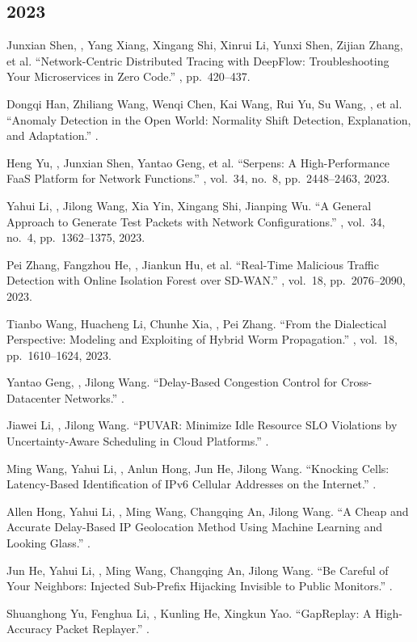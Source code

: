 \documentclass[11pt]{article}
\begin{document}
\subsection*{2023}
\begin{publist}
\item Junxian Shen, \corr, Yang Xiang, Xingang Shi, Xinrui Li, Yunxi
Shen, Zijian Zhang, et al. ``Network-Centric Distributed Tracing with DeepFlow:
Troubleshooting Your Microservices in Zero Code.'' ,
pp.~420--437.
\item Dongqi Han, Zhiliang Wang\corr, Wenqi Chen, Kai Wang, Rui Yu, Su Wang, , et al. ``Anomaly Detection in the Open World: Normality Shift Detection,
Explanation, and Adaptation.'' .
\item Heng Yu, \corr, Junxian Shen, Yantao Geng, et al. ``Serpens: A
High-Performance FaaS Platform for Network Functions.'' , vol.~34, no.~8, pp.~2448--2463, 2023.
\item Yahui Li, \corr, Jilong Wang, Xia Yin, Xingang Shi, Jianping Wu.
``A General Approach to Generate Test Packets with Network Configurations.''
, vol.~34, no.~4,
pp.~1362--1375, 2023.
\item Pei Zhang, Fangzhou He, \corr, Jiankun Hu, et al. ``Real-Time
Malicious Traffic Detection with Online Isolation Forest over SD-WAN.''
, vol.~18,
pp.~2076--2090, 2023.
\item Tianbo Wang, Huacheng Li, Chunhe Xia\corr, , Pei Zhang. ``From the
Dialectical Perspective: Modeling and Exploiting of Hybrid Worm Propagation.''
, vol.~18,
pp.~1610--1624, 2023.
\item Yantao Geng, \corr, Jilong Wang. ``Delay-Based Congestion Control
for Cross-Datacenter Networks.'' .
\item Jiawei Li, \corr, Jilong Wang. ``PUVAR: Minimize Idle Resource SLO
Violations by Uncertainty-Aware Scheduling in Cloud Platforms.''
.
\item Ming Wang, Yahui Li, , Anlun Hong, Jun He, Jilong Wang. ``Knocking
Cells: Latency-Based Identification of IPv6 Cellular Addresses on the Internet.''
.
\item Allen Hong, Yahui Li\corr, \corr, Ming Wang, Changqing An, Jilong
Wang. ``A Cheap and Accurate Delay-Based IP Geolocation Method Using Machine Learning
and Looking Glass.'' .
\item Jun He, Yahui Li\corr, \corr, Ming Wang, Changqing An, Jilong
Wang. ``Be Careful of Your Neighbors: Injected Sub-Prefix Hijacking Invisible to
Public Monitors.'' .
\item Shuanghong Yu, Fenghua Li\corr, , Kunling He, Xingkun Yao.
``GapReplay: A High-Accuracy Packet Replayer.'' .
\end{publist}
\end{document}

